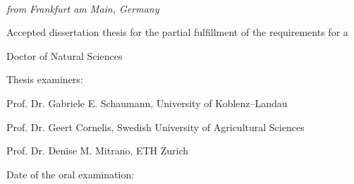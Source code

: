 \cleardoublepage%
{\setlength{\parindent}{0cm}
	\begin{fullwidth}%
		~\fontsize{36}{40}\selectfont\par{}%
		\vspace{2pc}%
		\fontsize{24}{28}\selectfont\par{}%
		\vspace{10pc}%
		\fontsize{18}{20}\selectfont\par{\allcaps{\thanklessauthor}}%
		\vspace{.5ex}
		\fontsize{18}{20}\selectfont\par{\textit{from Frankfurt am Main, Germany}}%
		\vfill%
		\fontsize{14}{16}\selectfont\par
		Accepted dissertation thesis for the partial fulfillment of the requirements for a\par
		Doctor of Natural Sciences\par
		\vspace{2pc}
		Thesis examiners:\par
		Prof. Dr. Gabriele E. Schaumann, University of Koblenz--Landau\par
		Prof. Dr. Geert Cornelis, Swedish University of Agricultural Sciences\par
		Prof. Dr. Denise M. Mitrano, ETH Zurich\par
		\vspace{2pc}
		Date of the oral examination: \thedate\par
		\vspace{4pc}
	\end{fullwidth}%
}
\thispagestyle{empty}%
\clearpage%